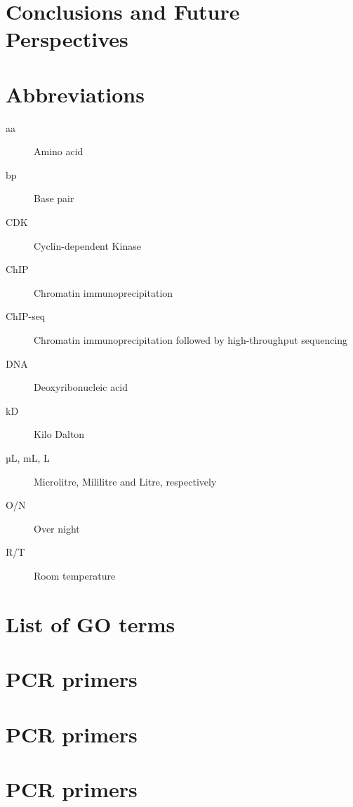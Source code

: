 \documentclass[11pt,twoside,a4paper]{report}
\begin{document}
\clearpage

\chapter{Conclusions and Future Perspectives}



\cleardoublepage
%
%




\cleardoublepage
\begin{appendices}
	\chapter{Abbreviations}
		\begin{description}
			\item[aa] Amino acid
			\item[bp] Base pair
			\item[CDK] Cyclin-dependent Kinase
			\item[ChIP] Chromatin immunoprecipitation
			\item[ChIP-seq] Chromatin immunoprecipitation followed by high-throughput sequencing
			\item[DNA] Deoxyribonucleic acid
			\item[kD] Kilo Dalton
			\item[µL, mL, L] Microlitre, Mililitre and Litre, respectively
			\item[O/N] Over night
			\item[R/T] Room temperature
		\end{description}

	\chapter{List of GO terms}
	\chapter{PCR primers}
	\chapter{PCR primers}
	\chapter{PCR primers}
\end{appendices}
\end{document}
